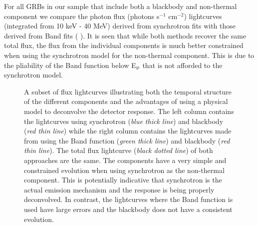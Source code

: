 For all GRBs in our sample that include both a blackbody and
non-thermal component we compare the photon flux (photons s$^{-1}$
cm$^{-2}$) lightcurves (integrated from 10 keV - 40 MeV) derived from
synchrotron fits with those derived from Band fits (
). It is seen that while both methods recover
the same total flux, the flux from the individual components is much
better constrained when using the synchrotron model for the
non-thermal component. This is due to the pliability of the Band
function below E$_{\rm p}$ that is not afforded to the synchrotron
model.
\begin{figure}

  \centering


  \caption{A subset of flux lightcurves illustrating both the temporal
    structure of the different components and the advantages of using a
    physical model to deconvolve the detector response. The left
    column contains the lightcurves using synchrotron (\emph{blue
      thick line}) and blackbody (\emph{red thin line}) while the
    right column contains the lightcurves made from using the Band
    function (\emph{green thick line}) and blackbody (\emph{red thin
      line}). The total flux lightcurve (\emph{black dotted line}) of
    both approaches are the same. The components have a very simple
    and constrained evolution when using synchrotron as the
    non-thermal component. This is potentially indicative that
    synchrotron is the actual emission mechanism and the response is
    being properly deconvolved. In contrast, the lightcurves where the
    Band function is used have large errors and the blackbody does not
    have a consistent evolution.}

  \label{fig:fluxComp}

\end{figure}



